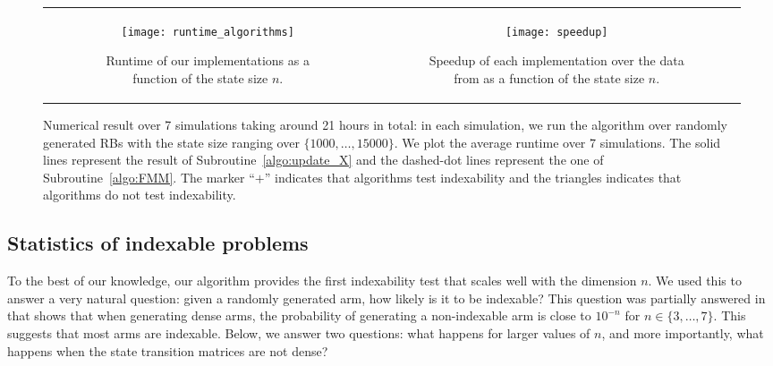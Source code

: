 \begin{figure}[ht]
    \begin{tabular}{cc}
        \begin{subfigure}[t]{0.45\linewidth}
            \texttt{[image: runtime\_algorithms]}
            \caption{Runtime of our implementations as a function of the state size $n$.}
            \label{fig:benchmark_algo_whittle_generic}
        \end{subfigure}            
        &\begin{subfigure}[t]{0.45\linewidth}
            \texttt{[image: speedup]}
            \caption{Speedup of each implementation over the data from \cite{nino2020fast} as a function of the state size $n$.}
            \label{fig:speedup}
        \end{subfigure}
    \end{tabular}
    \caption{Numerical result over 7 simulations taking around 21 hours in total: in each simulation, we run the algorithm over randomly generated RBs with the state size ranging over $\{1000,\dots,15000\}$. We plot the average runtime over 7 simulations. The solid lines represent the result of Subroutine~\ref{algo:update_X} and the dashed-dot lines represent the one of Subroutine~\ref{algo:FMM}. The marker ``$+$'' indicates that algorithms test indexability and the triangles indicates that algorithms do not test indexability.}
    \label{fig:numerical_result}
\end{figure}

\subsection{Statistics of indexable problems}

To the best of our knowledge, our algorithm provides the first indexability test that scales well with the dimension $n$. We used this to answer a very natural question: given a randomly generated arm, how likely is it to be indexable? This question was partially answered in \cite{nino2007dynamic} that shows that when generating dense arms, the probability of generating a non-indexable arm is close to $10^{-n}$ for $n\in\{3,\dots,7\}$. This suggests that most arms are indexable. Below, we answer two questions: what happens for larger values of $n$, and more importantly, what happens when the state transition matrices are not dense? 

